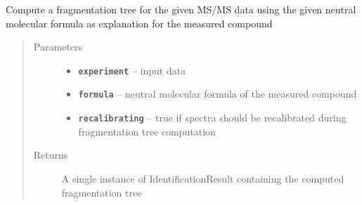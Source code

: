 \documentclass[letterpaper,10pt,openany,oneside]{sphinxmanual}
\begin{document}

\begin{fulllineitems}
\label{library:de.unijena.bioinf.sirius.compute(Ms2Experiment, MolecularFormula, boolean)}
Compute a fragmentation tree for the given MS/MS data using the given neutral molecular formula as explanation for the measured compound
\begin{quote}\begin{description}
\item[{Parameters}] \leavevmode\begin{itemize}
\item {} 
\textbf{\texttt{experiment}} -- input data

\item {} 
\textbf{\texttt{formula}} -- neutral molecular formula of the measured compound

\item {} 
\textbf{\texttt{recalibrating}} -- true if spectra should be recalibrated
during fragmentation tree computation

\end{itemize}

\item[{Returns}] \leavevmode
A single instance of IdentificationResult containing the computed fragmentation tree

\end{description}\end{quote}

\end{fulllineitems}

\end{document}
